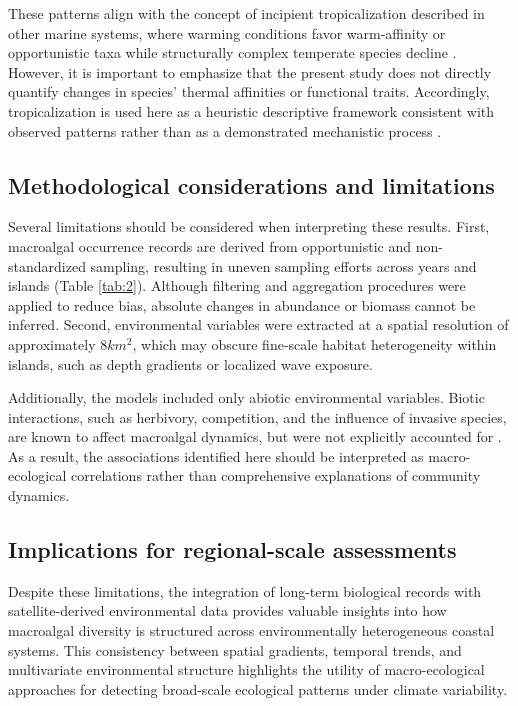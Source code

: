 \documentclass[a4paper,fleqn]{cas-sc}
\begin{document}
These patterns align with the concept of incipient tropicalization described in other marine systems, where warming conditions favor warm-affinity or opportunistic taxa while structurally complex temperate species decline \citep{Vergesetal2016, Wernbergetal2016}. However, it is important to emphasize that the present study does not directly quantify changes in species' thermal affinities or functional traits. Accordingly, tropicalization is used here as a heuristic descriptive framework consistent with observed patterns rather than as a demonstrated mechanistic process \citep{Wernbergetal2016}.

\subsection{Methodological considerations and limitations}

Several limitations should be considered when interpreting these results. First, macroalgal occurrence records are derived from opportunistic and non-standardized sampling, resulting in uneven sampling efforts across years and islands (Table \ref{tab:2}). Although filtering and aggregation procedures were applied to reduce bias, absolute changes in abundance or biomass cannot be inferred. Second, environmental variables were extracted at a spatial resolution of approximately $8 km^2$, which may obscure fine-scale habitat heterogeneity within islands, such as depth gradients or localized wave exposure.

Additionally, the models included only abiotic environmental variables. Biotic interactions, such as herbivory, competition, and the influence of invasive species, are known to affect macroalgal dynamics, but were not explicitly accounted for \citep{RILOV2020105045, JI202191}. As a result, the associations identified here should be interpreted as macro-ecological correlations rather than comprehensive explanations of community dynamics.

\subsection{Implications for regional-scale assessments}

Despite these limitations, the integration of long-term biological records with satellite-derived environmental data provides valuable insights into how macroalgal diversity is structured across environmentally heterogeneous coastal systems. This consistency between spatial gradients, temporal trends, and multivariate environmental structure highlights the utility of macro-ecological approaches for detecting broad-scale ecological patterns under climate variability. 
\end{document}
